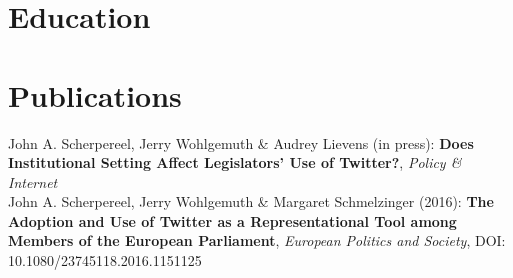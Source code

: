 \documentclass[10pt,a4paper,merriweather]{moderncv}        %
\begin{document}

\section{Education}

\section{Publications}
\small John A. Scherpereel, Jerry Wohlgemuth \& Audrey Lievens (in press): \textbf{Does Institutional Setting Affect Legislators’ Use of Twitter?}, \textit{Policy \& Internet}
\vspace{0.15cm}
\\
\small John A. Scherpereel, Jerry Wohlgemuth \& Margaret Schmelzinger (2016): \textbf{The Adoption and Use of Twitter as a Representational
Tool among Members of the European Parliament}, \textit{European Politics and Society}, DOI: 10.1080/23745118.2016.1151125

\clearpage





\end{document}
